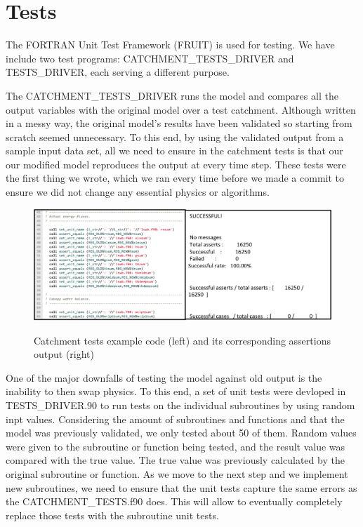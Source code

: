 \documentclass[pdftex,12pt,a4paper]{article}
\begin{document}
\section{Tests}

The FORTRAN Unit Test Framework (FRUIT) is used for testing. We have include two test programs: CATCHMENT\_TESTS\_DRIVER and TESTS\_DRIVER, each serving a different purpose.

The CATCHMENT\_TESTS\_DRIVER runs the model and compares all the output variables with the original model over a test catchment. Although written in a messy way, the original model's results have been validated so starting from scratch seemed unnecessary. To this end, by using the validated output from a sample input data set, all we need to ensure in the catchment tests is that our our modified model reproduces the output at every time step. These tests were the first thing we wrote, which we ran every time before we made a commit to ensure we did not change any essential physics or algorithms. 

\begin{figure}[h]
	\centering
	\includegraphics[width=5.5in]{Figures/Tests1.png}
	\label{Tests1}
	\caption{Catchment tests example code (left) and its corresponding assertions output (right)}
\end{figure}

One of the major downfalls of testing the model against old output is the inability to then swap physics. To this end, a set of unit tests were devloped in TESTS\_DRIVER.90 to run tests on the individual subroutines by using random inpt values.  Considering the amount of subroutines and functions and that the model was previously validated, we only tested about 50 of them. Random values were given to the subroutine or function being tested, and the result value was compared with the true value. The true value was previously calculated by the original subroutine or function. As we move to the next step and we implement new subroutines, we need to ensure that the unit tests capture the same errors as the CATCHMENT\_TESTS.f90 does. This will allow to eventually completely replace those tests with the subroutine unit tests.
\end{document}
